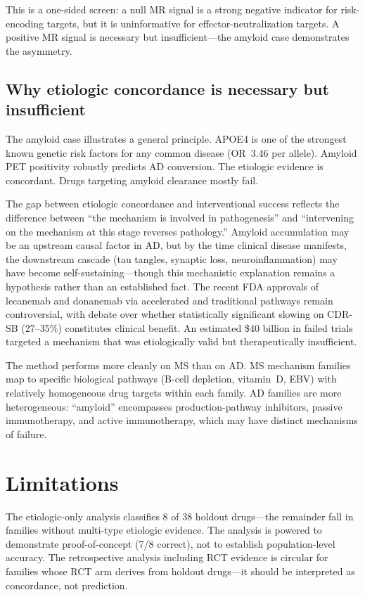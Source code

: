 \documentclass[11pt]{article}
\begin{document}
This is a one-sided screen: a null MR signal is a strong negative indicator for risk-encoding targets, but it is uninformative for effector-neutralization targets. A positive MR signal is necessary but insufficient---the amyloid case demonstrates the asymmetry.

\subsection{Why etiologic concordance is necessary but insufficient}

The amyloid case illustrates a general principle. APOE4 is one of the strongest known genetic risk factors for any common disease (OR~3.46 per allele). Amyloid PET positivity robustly predicts AD conversion. The etiologic evidence is concordant. Drugs targeting amyloid clearance mostly fail.

The gap between etiologic concordance and interventional success reflects the difference between ``the mechanism is involved in pathogenesis'' and ``intervening on the mechanism at this stage reverses pathology.'' Amyloid accumulation may be an upstream causal factor in AD, but by the time clinical disease manifests, the downstream cascade (tau tangles, synaptic loss, neuroinflammation) may have become self-sustaining---though this mechanistic explanation remains a hypothesis rather than an established fact. The recent FDA approvals of lecanemab and donanemab via accelerated and traditional pathways remain controversial, with debate over whether statistically significant slowing on CDR-SB (27--35\%) constitutes clinical benefit. An estimated \$40 billion in failed trials \citep{cummings_zhong2014} targeted a mechanism that was etiologically valid but therapeutically insufficient.

The method performs more cleanly on MS than on AD. MS mechanism families map to specific biological pathways (B-cell depletion, vitamin~D, EBV) with relatively homogeneous drug targets within each family. AD families are more heterogeneous: ``amyloid'' encompasses production-pathway inhibitors, passive immunotherapy, and active immunotherapy, which may have distinct mechanisms of failure.

\section{Limitations}
\label{sec:limitations}

The etiologic-only analysis classifies 8 of 38 holdout drugs---the remainder fall in families without multi-type etiologic evidence. The analysis is powered to demonstrate proof-of-concept (7/8 correct), not to establish population-level accuracy. The retrospective analysis including RCT evidence is circular for families whose RCT arm derives from holdout drugs---it should be interpreted as concordance, not prediction.
\end{document}
